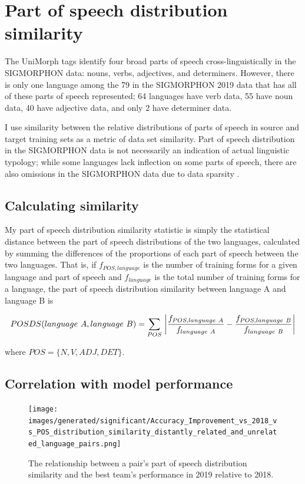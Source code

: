 \newpage

\section{Part of speech distribution similarity}

The UniMorph tags identify four broad parts of speech cross-linguistically in the SIGMORPHON data: nouns, verbs, adjectives, and determiners. However, there is only one language among the 79 in the SIGMORPHON 2019 data that has all of these parts of speech represented; 64 languages have verb data, 55 have noun data, 40 have adjective data, and only 2 have determiner data. 

I use similarity between the relative distributions of parts of speech in source and target training sets as a metric of data set similarity. Part of speech distribution in the SIGMORPHON data is not necessarily an indication of actual linguistic typology; while some languages lack inflection on some parts of speech, there are also omissions in the SIGMORPHON data due to data sparsity \parencite{Cotterell2018b}.

\subsection{Calculating similarity}

My part of speech distribution similarity statistic is simply the statistical distance between the part of speech distributions of the two languages, calculated by summing the differences of the proportions of each part of speech between the two languages. That is, if $f_{POS, language}$ is the number of training forms for a given language and part of speech and $f_{language}$ is the total number of training forms for a language, the part of speech distribution similarity between language A and language B is

\[POSDS(language\ A, language\ B) = \sum\limits_{POS}\ \abs*{\frac{f_{POS, language\ A}}{f_{language\ A}} - \frac{f_{POS, language\ B}}{f_{language\ B}}}\]

where $POS = \{N, V, ADJ, DET\}$.

\subsection{Correlation with model performance}

\begin{figure}[ht]
\texttt{[image: images/generated/significant/Accuracy\_Improvement\_vs\_2018\_vs\_POS\_distribution\_similarity\_distantly\_related\_and\_unrelated\_language\_pairs.png]}
\centering
\caption{The relationship between a pair's part of speech distribution similarity and the best team's performance in 2019 relative to 2018.}
\end{figure}

